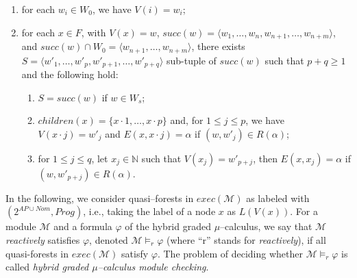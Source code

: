 \documentclass{LMCS}
\theoremstyle{plain}
\def \edge          {E}
\def \M             {\mathcal{M}}
\def \Nat           {\mathbb{N}}
\def \node          {V}
\newcommand \tpl[1] {\langle #1 \rangle}
\begin{document}
\begin{enumerate}[$\bullet$]
\item
for each $w_i \in W_0$, we have $\node(i)=w_i$;

\item
for each $x \in F$, with $\node(x) = w$, $succ(w) = \tpl{w_1,
\ldots, w_n, w_{n+1}, \ldots, w_{n+m}}$, and $succ(w) \cap W_0 =
\tpl{w_{n+1}, \ldots, w_{n+m}}$, there exists $S = \tpl{w'_1,
\ldots, w'_p, w'_{p+1}, \ldots, w'_{p+q}}$ sub-tuple of $succ(w)$
such that $p+q \geq 1$ and the following hold:

\begin{enumerate}[$-$]
\item
$S = succ(w)$ if $w \in W_s$;

\item
$children(x) = \{x \cdot 1, \ldots, x \cdot p\}$ and, for $1 \leq
j \leq p$, we have $\node(x \cdot j) = w'_j$ and $\edge(x, x \cdot
j) = \alpha$ if $(w, w'_j) \in R(\alpha)$;

\item
for $1 \leq j \leq q$, let $x_j \in \Nat$ such that $\node(x_j) =
w'_{p+j}$, then $\edge(x, x_j) = \alpha$ if $(w, w'_{p+j}) \in
R(\alpha)$.
\end{enumerate}
\end{enumerate}
In the following, we consider quasi--forests in $exec(\M)$ as labeled with
$(2^{AP \cup Nom}, \allowbreak Prog)$, i.e., taking the label of a node $x$ as
$L(\node(x))$. For a module $\M$ and a formula $\varphi$ of the hybrid graded
$\mu$--calculus, we say that $\M$ \emph{reactively} satisfies $\varphi$,
denoted $\M\models_r\varphi$ (where ``r'' stands for \emph{reactively}), if all
quasi-forests in $exec(\M)$ satisfy $\varphi$. The problem of deciding whether
$\M \models_r \varphi$ is called \emph{hybrid graded $\mu$--calculus module
checking}.
\end{document}
